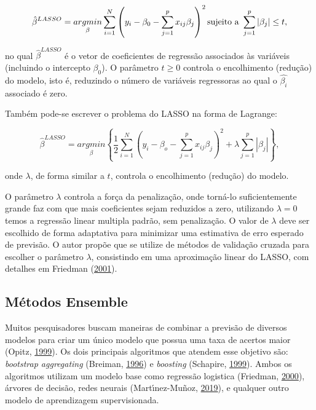\documentclass[
	12pt,				%
	a4paper,		%
	oneside,    %
	chapter=TITLE,		   %
	section=TITLE,		   %
	subsection=TITLE,	   %
	subsubsection=TITLE, %
	english,			%
	french,				%
	spanish,			%
	brazil,				%
]{abntex2}
\begin{document}
\[
\hat{\beta}^{LASSO} =\underset{\beta}{argmin}  \sum_{i=1}^N \left( y_i-\beta_0 -\sum_{j=1}^p x_{ij} \beta_j\right)^2 \hbox{sujeito a } \sum_{j=1}^p|\beta_j|\leq t,
\]

\noindent no qual \(\hat{\beta}^{LASSO}\) é o vetor de coeficientes de
regressão associados às variáveis (incluindo o intercepto \(\beta_0\)).
O parâmetro \(t\geq0\) controla o encolhimento (redução) do modelo, isto
é, reduzindo o número de variáveis regressoras ao qual o
\(\hat{\beta_i}\) associado é zero.

Também pode-se escrever o problema do LASSO na forma de Lagrange:

\[\hat{\beta}^{LASSO}=\underset{\beta}{argmin} \left\{ \frac{1}{2} \sum_{i=1}^N \left( y_i-\beta_o-\sum_{j=1}^px_{ij}\beta_j \right)^2 + \lambda\sum_{j=1}^p|\beta_j| \right\},\]

\noindent onde \(\lambda\), de forma similar a \(t\), controla o
encolhimento (redução) do modelo.

O parâmetro \(\lambda\) controla a força da penalização, onde torná-lo
suficientemente grande faz com que mais coeficientes sejam reduzidos a
zero, utilizando \(\lambda=0\) temos a regressão linear multipla padrão,
sem penalização. O valor de \(\lambda\) deve ser escolhido de forma
adaptativa para minimizar uma estimativa de erro esperado de previsão. O
autor propõe que se utilize de métodos de validação cruzada para
escolher o parâmetro \(\lambda\), consistindo em uma aproximação linear
do LASSO, com detalhes em Friedman
(\protect\hyperlink{ref-friedman2001elements}{2001}).

\hypertarget{muxe9todos-ensemble}{%
\subsection{Métodos Ensemble}\label{muxe9todos-ensemble}}

Muitos pesquisadores buscam maneiras de combinar a previsão de diversos
modelos para criar um único modelo que possua uma taxa de acertos maior
(Opitz, \protect\hyperlink{ref-opitz1999popular}{1999}). Os dois
principais algoritmos que atendem esse objetivo são: \emph{bootstrap
aggregating} (Breiman, \protect\hyperlink{ref-breiman1996bagging}{1996})
e \emph{boosting} (Schapire,
\protect\hyperlink{ref-schapire1999brief}{1999}). Ambos os algoritmos
utilizam um modelo base como regressão logistica (Friedman,
\protect\hyperlink{ref-friedman2000additive}{2000}), árvores de decisão,
redes neurais (Martı́nez-Muñoz,
\protect\hyperlink{ref-martinez2019sequential}{2019}), e qualquer outro
modelo de aprendizagem supervisionada.
\end{document}
